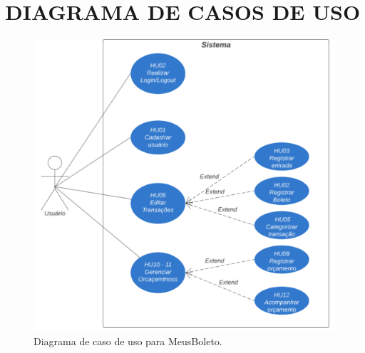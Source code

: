 \chapter{DIAGRAMA DE CASOS DE USO}


\begin{figure}[htb]
	\caption{\label{fig:useCase}Diagrama de caso de uso para MeusBoleto.}
	\begin{center}
		\includegraphics[scale=1]{images/UseCase.png}
	\end{center}
\end{figure}
